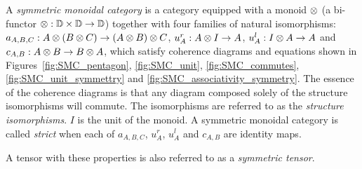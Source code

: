 \begin{definition}\label{symmetricmonoidalcat}
  A \emph{symmetric monoidal category}\cite{barr:ctcs,maclan97:categorieswrkmath} \cD{} is a
  category equipped with a monoid $\otimes$ (a bi-functor $\otimes:\mathbb{D} \times \mathbb{D} \to \mathbb{D}$) together with
  four families of natural isomorphisms:  $a_{A,B,C}:A\otimes(B\otimes C) \to (A\otimes B)\otimes C$, $u^r_{A}:A\otimes I\to A$,
  $u^l_{A}:I\otimes A \to A$ and $c_{A,B}:A\otimes B \to B\otimes A$, which satisfy coherence diagrams and
  equations shown in Figures~\ref{fig:SMC_pentagon}, \ref{fig:SMC_unit}, \ref{fig:SMC_commutes},
  \ref{fig:SMC_unit_symmettry} and \ref{fig:SMC_associativity_symmetry}. The essence of the
  coherence diagrams is that any diagram composed solely of the structure isomorphisms will
  commute. The isomorphisms are referred to as the \emph{structure isomorphisms}. $I$ is the
  unit of the monoid. A symmetric monoidal category is called \emph{strict} when each of
  $a_{A,B,C}$, $u^r_{A}$, $u^l_{A}$ and $c_{A,B}$ are identity maps.

  A tensor with these properties is also referred to as a \emph{symmetric tensor}.
\end{definition}

